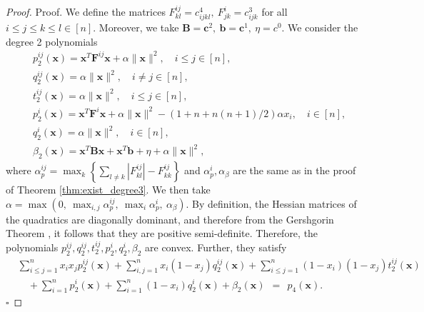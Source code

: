 \documentclass[opre,nonblindrev]{informs3} %
\begin{document}
\begin{proof}{Proof. }
{\color{black} We define the matrices $F_{kl}^{ij} = c_{ijkl}^4, \: F_{jk}^i = c_{ijk}^3$ for all $i \le j \le k \le l \in [n]$. Moreover, we take $\boldsymbol{B} = \boldsymbol{c}^2, \: \boldsymbol{b} = \boldsymbol{c}^1, \: \eta = c^{0}$. We consider the degree 2 polynomials 
\begin{align*}
    & p_2^{ij}(\boldsymbol{x}) = \boldsymbol{x}^T \boldsymbol{F}^{ij} \boldsymbol{x} + \alpha \|\boldsymbol{x}\|^2, \quad i \le j \in [n], \\ 
    & q_2^{ij}(\boldsymbol{x}) = \alpha \|\boldsymbol{x}\|^2, \quad i \neq j \in [n], \\ 
    & t_2^{ij}(\boldsymbol{x}) = \alpha \|\boldsymbol{x}\|^2 , \quad i \le j \in [n], \\ 
    & p_2^i(\boldsymbol{x}) = \boldsymbol{x}^T \boldsymbol{F}^i \boldsymbol{x} + \alpha \|\boldsymbol{x}\|^2 - \left(1 + n + n(n+1)/2 \right)\alpha x_i, \quad i \in [n], \\ 
    & q_2^i(\boldsymbol{x}) = \alpha \|\boldsymbol{x}\|^2, \quad i \in [n], \\ 
    & \beta_2(\boldsymbol{x}) = \boldsymbol{x}^T \boldsymbol{B} \boldsymbol{x} + \boldsymbol{x}^T \boldsymbol{b} + \eta + \alpha \|\boldsymbol{x}\|^2,
\end{align*} 
where $\alpha_p^{ij} = \max_k \left\{ \sum_{l \neq k} |F_{kl}^{ij}| - F_{kk}^{ij} \right\}$ and $\alpha_p^i, \alpha_{\beta}$ are the same as in the proof of Theorem \ref{thm:exist_degree3}. We then take $\alpha = \max \left(0, \: \max_{i,j} \alpha_p^{ij}, \: \max_i \alpha_p^i, \: \alpha_{\beta} \right)$. By definition, the Hessian matrices of the quadratics are diagonally dominant, and therefore from the Gershgorin Theorem \cite{gershgorin1931uber}, it follows that they are positive semi-definite. Therefore, the polynomials $p_2^{ij},q_2^{ij},t_2^{ij},p_2^i,q_2^i,\beta_2$ are convex.} Further, they satisfy 
\begin{align*}
    & \sum_{i \le j=1}^n x_i x_j p_2^{ij}(\boldsymbol{x}) + \sum_{i,j=1}^n x_i(1-x_j) q_2^{ij}(\boldsymbol{x}) + \sum_{i \le j=1}^n (1-x_i)(1-x_j)t_2^{ij}(\boldsymbol{x}) \\
    &\quad + \sum_{i=1}^n p_2^i(\boldsymbol{x}) + \sum_{i=1}^n(1-x_i)q_2^i(\boldsymbol{x}) + \beta_2(\boldsymbol{x}) \: \: = \: \: p_4(\boldsymbol{x}).
\end{align*}  \hfill $\square$  
\end{proof}     
\end{document}
